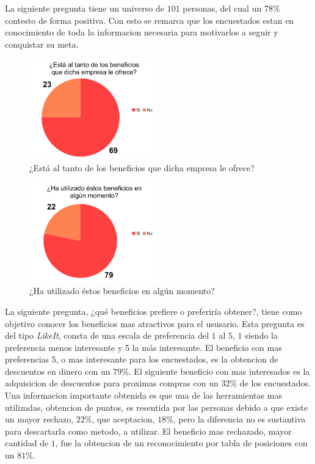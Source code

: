 La siguiente pregunta tiene un universo de $101$ personas, del cual un $78\%$ contesto de forma positiva.
Con esto se remarca que los encuestados estan en conocimiento de toda la informacion necesaria 
para motivarlos a seguir y conquistar su meta.

\begin{figure}[!htb]
  \centering
  \includegraphics[width=0.5\textwidth]{images/chartPreg5.png}
  \caption[chart5]{¿Está al tanto de los beneficios que dicha empresa le ofrece?}
  \label{fig:chart2}
\end{figure}


\begin{figure}[!htb]
  \centering
  \includegraphics[width=0.5\textwidth]{images/chartPreg6.png}
  \caption[chart6]{¿Ha utilizado éstos beneficios en algún momento?}
  \label{fig:chart2}
\end{figure}

La siguiente pregunta, ¿qué beneficios prefiere o preferiría obtener?, tiene como objetivo conocer los
 beneficios mas atractivos para el ususario. Esta pregunta es del tipo \emph{LikeIt}, consta de una 
escala de preferencia del $1$ al $5$, $1$ siendo la preferencia menos interesante y 5 la más interesante.
 El beneficio con mas preferencias $5$, o mas interesante para los encuestados, es la obtencion de
descuentos en dinero con un $79\%$. El siguiente beneficio con mas interesados es la adquisicion 
de descuentos para proximas compras con un $32\%$ de los encuestados. Una informacion importante 
obtenida es que una de las herramientas mas utilizadas, obtencion de puntos, es resentida por las
personas debido a que existe un mayor rechazo, $22\%$, que aceptacion, $18\%$, pero la diferencia 
no es sustantiva para descartarla como metodo, {} a utilizar.
 El beneficio mas rechazado, mayor cantidad de $1$, fue la obtencion de un reconocimiento por tabla
 de posiciones con un $81\%$.

